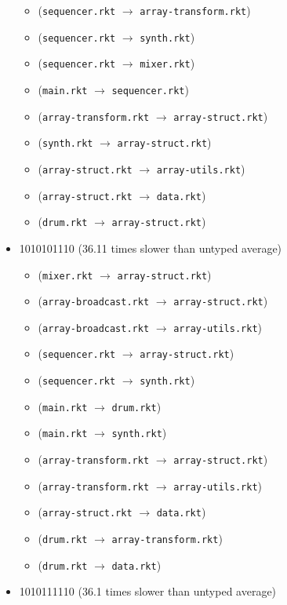 \documentclass{article}
\newcommand{\mono}[1]{\texttt{#1}}
\begin{document}
\begin{itemize}
\begin{itemize}
  \item (\mono{sequencer.rkt} $\rightarrow$ \mono{array-transform.rkt})
  \item (\mono{sequencer.rkt} $\rightarrow$ \mono{synth.rkt})
  \item (\mono{sequencer.rkt} $\rightarrow$ \mono{mixer.rkt})
  \item (\mono{main.rkt} $\rightarrow$ \mono{sequencer.rkt})
  \item (\mono{array-transform.rkt} $\rightarrow$ \mono{array-struct.rkt})
  \item (\mono{synth.rkt} $\rightarrow$ \mono{array-struct.rkt})
  \item (\mono{array-struct.rkt} $\rightarrow$ \mono{array-utils.rkt})
  \item (\mono{array-struct.rkt} $\rightarrow$ \mono{data.rkt})
  \item (\mono{drum.rkt} $\rightarrow$ \mono{array-struct.rkt})
  \end{itemize}
\item 1010101110 (36.11 times slower than untyped average)
  \begin{itemize}
  \item (\mono{mixer.rkt} $\rightarrow$ \mono{array-struct.rkt})
  \item (\mono{array-broadcast.rkt} $\rightarrow$ \mono{array-struct.rkt})
  \item (\mono{array-broadcast.rkt} $\rightarrow$ \mono{array-utils.rkt})
  \item (\mono{sequencer.rkt} $\rightarrow$ \mono{array-struct.rkt})
  \item (\mono{sequencer.rkt} $\rightarrow$ \mono{synth.rkt})
  \item (\mono{main.rkt} $\rightarrow$ \mono{drum.rkt})
  \item (\mono{main.rkt} $\rightarrow$ \mono{synth.rkt})
  \item (\mono{array-transform.rkt} $\rightarrow$ \mono{array-struct.rkt})
  \item (\mono{array-transform.rkt} $\rightarrow$ \mono{array-utils.rkt})
  \item (\mono{array-struct.rkt} $\rightarrow$ \mono{data.rkt})
  \item (\mono{drum.rkt} $\rightarrow$ \mono{array-transform.rkt})
  \item (\mono{drum.rkt} $\rightarrow$ \mono{data.rkt})
  \end{itemize}
\item 1010111110 (36.1 times slower than untyped average)
  \begin{itemize}

\end{itemize}
\end{itemize}
\end{document}
